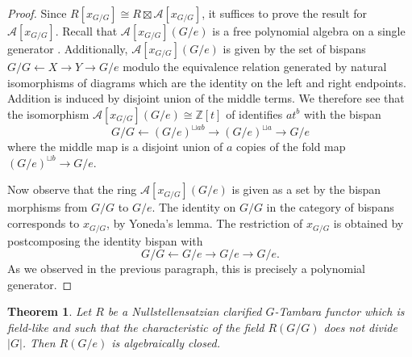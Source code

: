 \documentclass[11pt,dvipsnames]{amsart}
\newcommand{\Z}{\mathbb{Z}}
\newtheorem{theorem}{Theorem}[section]
\theoremstyle{BoldRemark}
\begin{document}
\begin{proof}
	Since $R[x_{G/G}] \cong R \boxtimes \mathcal{A}[x_{G/G}]$, it suffices to prove the result for $\mathcal{A}[x_{G/G}]$.	Recall that $\mathcal{A}[x_{G/G}](G/e)$ is a free polynomial algebra on a single generator \cite[Theorem A]{Bru05}. Additionally, $\mathcal{A}[x_{G/G}](G/e)$ is given by the set of bispans $G/G \leftarrow X \rightarrow Y \rightarrow G/e$ modulo the equivalence relation generated by natural isomorphisms of diagrams which are the identity on the left and right endpoints. Addition is induced by disjoint union of the middle terms. We therefore see that the isomorphism $\mathcal{A}[x_{G/G}](G/e) \cong \Z[t]$ of \cite[Theorem A]{Bru05} identifies $at^b$ with the bispan \[ G/G \leftarrow \left( G/e \right)^{\sqcup ab} \rightarrow \left( G/e \right)^{\sqcup a} \rightarrow G/e \] where the middle map is a disjoint union of $a$ copies of the fold map $\left( G/e \right)^{\sqcup b} \rightarrow G/e$.
	
	Now observe that the ring $\mathcal{A}[x_{G/G}](G/e)$ is given as a set by the bispan morphisms from $G/G$ to $G/e$. The identity on $G/G$ in the category of bispans corresponds to $x_{G/G}$, by Yoneda's lemma. The restriction of $x_{G/G}$ is obtained by postcomposing the identity bispan with \[ G/G \leftarrow G/e \rightarrow G/e \rightarrow G/e . \] As we observed in the previous paragraph, this is precisely a polynomial generator.
\end{proof}

\begin{theorem}\label{thm:NSS-clarified-field-like-are-boring}
	Let $R$ be a Nullstellensatzian clarified $G$-Tambara functor which is field-like and such that the characteristic of the field $R(G/G)$ does not divide $|G|$. Then $R(G/e)$ is algebraically closed.
\end{theorem}
\end{document}
